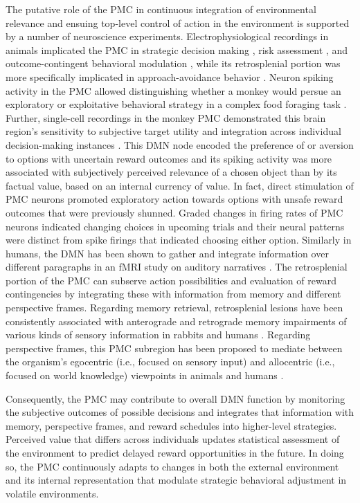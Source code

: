 \documentclass[10pt,letterpaper]{article}
\begin{document}
The putative role of the PMC in continuous integration of environmental relevance
and ensuing top-level control of action in the environment is supported
by a number of neuroscience experiments.
Electrophysiological recordings in animals implicated the PMC in
strategic decision making \citep{pearson2009neurons},
risk assessment \citep{mccoy2005risk},
and outcome-contingent behavioral modulation \citep{hayden2009electrophysiological},
while its retrosplenial portion was
more specifically implicated in approach-avoidance behavior
\citep{vann2009does}.
Neuron spiking activity in the PMC allowed distinguishing
whether a monkey would persue an exploratory or exploitative
behavioral strategy in a complex food foraging task \citep{pearson2009neurons}.
Further, single-cell recordings in the monkey PMC
demonstrated this brain region's sensitivity to
subjective target utility \citep{mccoy2005risk} and integration
across individual decision-making instances \citep{pearson2009neurons}.
This DMN node encoded the
preference of or aversion to options with uncertain reward outcomes
and its spiking activity was more associated with
subjectively perceived relevance of a chosen object
than by its factual value, based on an internal currency of value.
In fact, direct stimulation of PMC neurons
promoted exploratory action towards options
with unsafe reward outcomes that were previously shunned.
Graded changes in firing rates of PMC neurons
indicated changing choices in upcoming trials and their neural patterns were
distinct from spike firings that indicated choosing either option.
Similarly in humans,
the DMN has been shown to gather and integrate information
over different paragraphs in an fMRI study on auditory narratives
\citep{simony2016dynamic}.
%
The retrosplenial portion of the PMC can subserve action possibilities
and evaluation of reward contingencies by integrating these with
information from memory and different perspective frames.
Regarding memory retrieval, retrosplenial lesions have been
consistently associated with anterograde and retrograde memory impairments
of various kinds of sensory information
in rabbits and humans
\citep{vann2009does}.
Regarding perspective frames, this PMC subregion has been
proposed to mediate between the organism's egocentric
(i.e., focused on sensory input) and
allocentric (i.e., focused on world knowledge) viewpoints
in animals and humans
\citep{epstein2008parahippocampal, burgess2008spatial, valiquette2007different}.



Consequently, the PMC may contribute to overall DMN function
by monitoring the subjective outcomes
of possible decisions and integrates that information
with memory, perspective frames, and
reward schedules into higher-level strategies.
Perceived value that differs across individuals updates
statistical assessment of the environment
to predict delayed reward opportunities in the future.
In doing so, the PMC continuously adapts to changes
in both the external environment and its internal representation
that modulate strategic behavioral adjustment in volatile environments.
\end{document}
